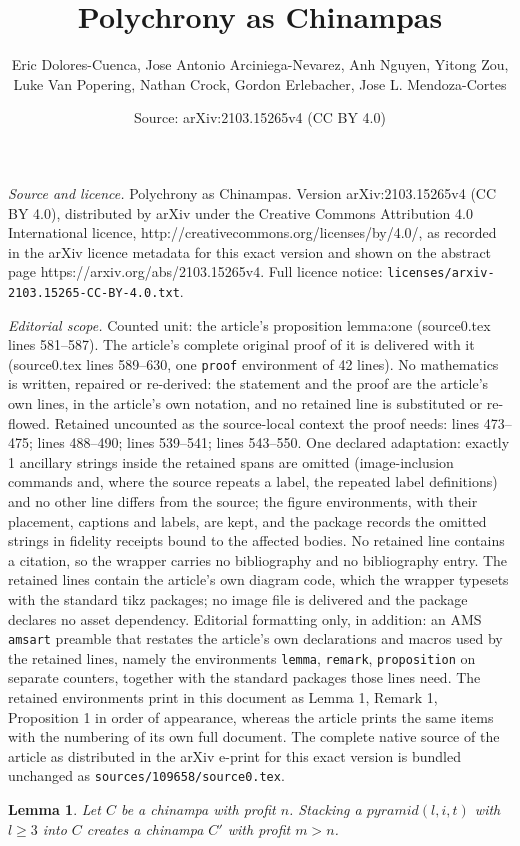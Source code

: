 \documentclass[10pt,a4paper]{amsart}
\title{Polychrony as Chinampas}
\author{Eric Dolores-Cuenca, Jose Antonio Arciniega-Nevarez, Anh Nguyen, Yitong Zou, Luke Van Popering, Nathan Crock, Gordon Erlebacher, Jose L. Mendoza-Cortes}
\date{Source: arXiv:2103.15265v4 (CC BY 4.0)}
\newtheorem{lemma}{Lemma}
\newcommand{\pyr}[3][l]{\ensuremath{pyramid(#1,#2,#3)}}
\begin{document}
\maketitle

\noindent\emph{Source and licence.} Polychrony as Chinampas. Version arXiv:2103.15265v4 (CC BY 4.0), distributed by arXiv under the Creative Commons Attribution 4.0 International licence, http://creativecommons.org/licenses/by/4.0/, as recorded in the arXiv licence metadata for this exact version and shown on the abstract page https://arxiv.org/abs/2103.15265v4. Full licence notice: \texttt{licenses/arxiv-2103.15265-CC-BY-4.0.txt}.\par\smallskip

\noindent\textit{Editorial scope.} Counted unit: the article's proposition lemma:one (source0.tex lines 581--587). The article's complete original proof of it is delivered with it (source0.tex lines 589--630, one \texttt{proof} environment of 42 lines). No mathematics is written, repaired or re-derived: the statement and the proof are the article's own lines, in the article's own notation, and no retained line is substituted or re-flowed.  Retained uncounted as the source-local context the proof needs: lines 473--475; lines 488--490; lines 539--541; lines 543--550.  One declared adaptation: exactly 1 ancillary strings inside the retained spans are omitted (image-inclusion commands and, where the source repeats a label, the repeated label definitions) and no other line differs from the source; the figure environments, with their placement, captions and labels, are kept, and the package records the omitted strings in fidelity receipts bound to the affected bodies.  No retained line contains a citation, so the wrapper carries no bibliography and no bibliography entry.  The retained lines contain the article's own diagram code, which the wrapper typesets with the standard tikz packages; no image file is delivered and the package declares no asset dependency.  Editorial formatting only, in addition: an AMS \texttt{amsart} preamble that restates the article's own declarations and macros used by the retained lines, namely the environments \texttt{lemma}, \texttt{remark}, \texttt{proposition} on separate counters, together with the standard packages those lines need.  The retained environments print in this document as Lemma 1, Remark 1, Proposition 1 in order of appearance, whereas the article prints the same items with the numbering of its own full document.  The complete native source of the article as distributed in the arXiv e-print for this exact version is bundled unchanged as \texttt{sources/109658/source0.tex}.
\begin{lemma}\label{lemma:plus}
Let $C$ be a chinampa with profit $n$. Stacking a $\pyr{i}{t}$ with $l\geq 3$ into $C$ creates a chinampa $C'$ with profit $m>n$.  
\end{lemma}
\end{document}

